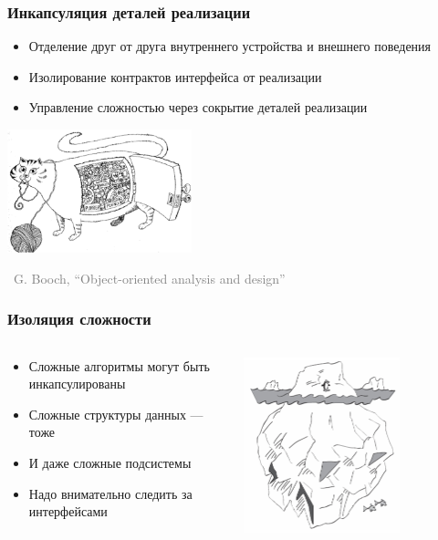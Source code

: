 \documentclass[xetex,mathserif,serif]{beamer}
\newcommand{\attribution}[1] {
\vspace{-5mm}\begin{flushright}\begin{scriptsize}\textcolor{gray}{\textcopyright\, #1}\end{scriptsize}\end{flushright}
}
\begin{document}
	\begin{frame}
		\frametitle{Инкапсуляция деталей реализации}
		\begin{itemize}
			\item Отделение друг от друга внутреннего устройства и внешнего поведения
			\item Изолирование контрактов интерфейса от реализации
			\item Управление сложностью через сокрытие деталей реализации
		\end{itemize}
		\vskip 1.5cm
		\begin{center}
			\includegraphics[width=0.4\textwidth]{incapsulation.png}
			\attribution{G. Booch, ``Object-oriented analysis and design''}
		\end{center}
	\end{frame}

	\begin{frame}
		\frametitle{Изоляция сложности}
		\begin{columns}
			\begin{column}{0.6\textwidth}
				\begin{itemize}
					\item Сложные алгоритмы могут быть инкапсулированы
					\item Сложные структуры данных --- тоже
					\item И даже сложные подсистемы
					\item Надо внимательно следить за интерфейсами
				\end{itemize}
			\end{column}
			\begin{column}{0.4\textwidth}
				\includegraphics[width=0.7\textwidth]{complexity.png}
			\end{column}
		\end{columns}
	\end{frame}
\end{document}
